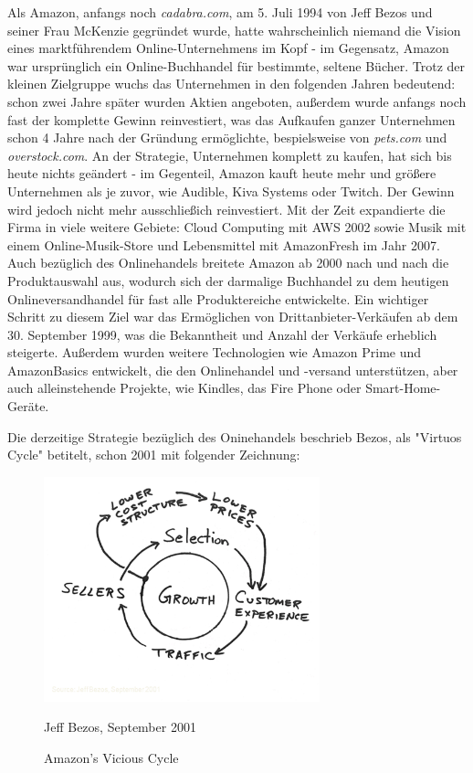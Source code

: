 Als Amazon, anfangs noch \emph{cadabra.com}, am 5. Juli 1994 von Jeff Bezos und seiner Frau McKenzie gegründet wurde, hatte wahrscheinlich niemand die Vision eines marktführendem Online-Unternehmens im Kopf - im Gegensatz, Amazon war ursprünglich ein Online-Buchhandel für bestimmte, seltene Bücher\cite[S. 17]{Graf}. Trotz der kleinen Zielgruppe wuchs das Unternehmen in den folgenden Jahren bedeutend: schon zwei Jahre später wurden Aktien angeboten, außerdem wurde anfangs noch fast der komplette Gewinn reinvestiert\cite{Rosoff}, was das Aufkaufen ganzer Unternehmen schon 4 Jahre nach der Gründung ermöglichte, bespielsweise von \emph{pets.com} und \emph{overstock.com}\cite{ChannelAdvisor}. An der Strategie, Unternehmen komplett zu kaufen, hat sich bis heute nichts geändert - im Gegenteil, Amazon kauft heute mehr und größere Unternehmen als je zuvor\cite[S. 27]{Haendlerbund}, wie Audible, Kiva Systems oder Twitch\cite{Sherman}. Der Gewinn wird jedoch nicht mehr ausschließich reinvestiert\cite{Rosoff}. Mit der Zeit expandierte die Firma in viele weitere Gebiete: Cloud Computing mit \ac{AWS} 2002 sowie Musik mit einem Online-Musik-Store und Lebensmittel mit AmazonFresh im Jahr 2007\cite{Sherman, ChannelAdvisor}. Auch bezüglich des Onlinehandels breitete Amazon ab 2000 nach und nach die Produktauswahl aus, wodurch sich der darmalige Buchhandel zu dem heutigen Onlineversandhandel für fast alle Produktereiche entwickelte. Ein wichtiger Schritt zu diesem Ziel war das Ermöglichen von Drittanbieter-Verkäufen ab dem 30. September 1999, was die Bekanntheit und Anzahl der Verkäufe erheblich steigerte\cite{Sherman}. Außerdem wurden weitere Technologien wie Amazon Prime und AmazonBasics entwickelt, die den Onlinehandel und -versand unterstützen\cite{ChannelAdvisor}, aber auch alleinstehende Projekte, wie Kindles, das Fire Phone oder Smart-Home-Geräte\cite{Sherman}.

Die derzeitige Strategie bezüglich des Oninehandels beschrieb Bezos, als "Virtuos Cycle" betitelt, schon 2001  mit folgender Zeichnung\cite{zentail}:
\begin{figure}[h]
    \begin{center}
        \includegraphics[width=8cm]{media/Fabian-vicious-cycle.png}
        \caption{Amazon's Vicious Cycle}
        \label{vicious-cycle}
        \bildquelle Jeff Bezos, September 2001 %
    \end{center}
\end{figure} 

